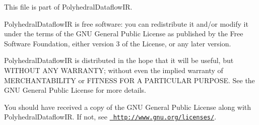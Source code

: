 This file is part of Polyhedral\+Dataflow\+IR.

Polyhedral\+Dataflow\+IR is free software\+: you can redistribute it and/or modify it under the terms of the G\+NU General Public License as published by the Free Software Foundation, either version 3 of the License, or any later version.

Polyhedral\+Dataflow\+IR is distributed in the hope that it will be useful, but W\+I\+T\+H\+O\+UT A\+NY W\+A\+R\+R\+A\+N\+TY; without even the implied warranty of M\+E\+R\+C\+H\+A\+N\+T\+A\+B\+I\+L\+I\+TY or F\+I\+T\+N\+E\+SS F\+OR A P\+A\+R\+T\+I\+C\+U\+L\+AR P\+U\+R\+P\+O\+SE. See the G\+NU General Public License for more details.

You should have received a copy of the G\+NU General Public License along with Polyhedral\+Dataflow\+IR. If not, see \href{http://www.gnu.org/licenses/}{\texttt{ http\+://www.\+gnu.\+org/licenses/}}. 